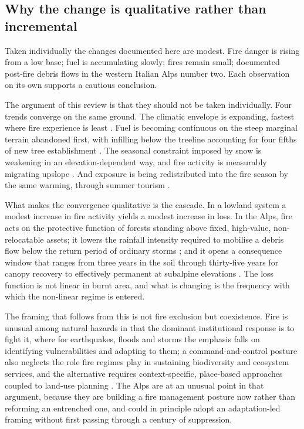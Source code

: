 \documentclass[11pt,a4paper]{article}
\begin{document}
\subsection{Why the change is qualitative rather than incremental}

Taken individually the changes documented here are modest. Fire danger is rising from a low base; fuel is accumulating slowly; fires remain small; documented post-fire debris flows in the western Italian Alps number two. Each observation on its own supports a cautious conclusion.

The argument of this review is that they should not be taken individually. Four trends converge on the same ground. The climatic envelope is expanding, fastest where fire experience is least \citep{gerberding_mapping_2025, miller_climate_2024}. Fuel is becoming continuous on the steep marginal terrain abandoned first, with infilling below the treeline accounting for four fifths of new tree establishment \citep{frei_evidence_2023, garbarino_contrasting_2020, conedera_linking_2024}. The seasonal constraint imposed by snow is weakening in an elevation-dependent way, and fire activity is measurably migrating upslope \citep{rangwala_climate_2012, beloiu_climatedriven_2026}. And exposure is being redistributed into the fire season by the same warming, through summer tourism \citep{pede_mountain_2022}.

What makes the convergence qualitative is the cascade. In a lowland system a modest increase in fire activity yields a modest increase in loss. In the Alps, fire acts on the protective function of forests standing above fixed, high-value, non-relocatable assets; it lowers the rainfall intensity required to mobilise a debris flow below the return period of ordinary storms \citep{laporta_postwildfire_2025}; and it opens a consequence window that ranges from three years in the soil \citep{negri_wildfire_2026} through thirty-five years for canopy recovery \citep{stritih_alternative_2023} to effectively permanent at subalpine elevations \citep{degiuli_arrested_2024}. The loss function is not linear in burnt area, and what is changing is the frequency with which the non-linear regime is entered.

The framing that follows from this is not fire exclusion but coexistence. Fire is unusual among natural hazards in that the dominant institutional response is to fight it, where for earthquakes, floods and storms the emphasis falls on identifying vulnerabilities and adapting to them; a command-and-control posture also neglects the role fire regimes play in sustaining biodiversity and ecosystem services, and the alternative requires context-specific, place-based approaches coupled to land-use planning \citep{moritz_learning_2014}. The Alps are at an unusual point in that argument, because they are building a fire management posture now rather than reforming an entrenched one, and could in principle adopt an adaptation-led framing without first passing through a century of suppression.
\end{document}
